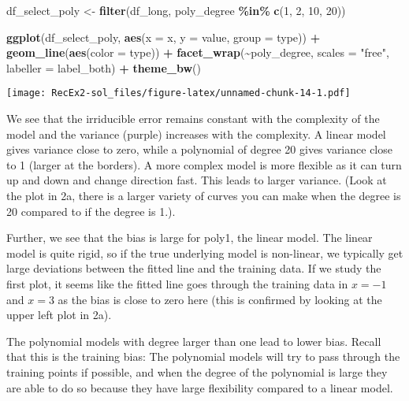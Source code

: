 \documentclass[
]{article}
\newenvironment{Shaded}{\begin{snugshade}}{\end{snugshade}}
\newcommand{\AttributeTok}[1]{\textcolor[rgb]{0.13,0.29,0.53}{#1}}
\newcommand{\DecValTok}[1]{\textcolor[rgb]{0.00,0.00,0.81}{#1}}
\newcommand{\FunctionTok}[1]{\textcolor[rgb]{0.13,0.29,0.53}{\textbf{#1}}}
\newcommand{\NormalTok}[1]{#1}
\newcommand{\OtherTok}[1]{\textcolor[rgb]{0.56,0.35,0.01}{#1}}
\newcommand{\SpecialCharTok}[1]{\textcolor[rgb]{0.81,0.36,0.00}{\textbf{#1}}}
\newcommand{\StringTok}[1]{\textcolor[rgb]{0.31,0.60,0.02}{#1}}
\begin{document}
\begin{Shaded}
\begin{Highlighting}[]
\NormalTok{df\_select\_poly }\OtherTok{\textless{}{-}} \FunctionTok{filter}\NormalTok{(df\_long, poly\_degree }\SpecialCharTok{\%in\%} \FunctionTok{c}\NormalTok{(}\DecValTok{1}\NormalTok{, }\DecValTok{2}\NormalTok{, }\DecValTok{10}\NormalTok{, }\DecValTok{20}\NormalTok{))}

\FunctionTok{ggplot}\NormalTok{(df\_select\_poly, }\FunctionTok{aes}\NormalTok{(}\AttributeTok{x =}\NormalTok{ x, }\AttributeTok{y =}\NormalTok{ value, }\AttributeTok{group =}\NormalTok{ type)) }\SpecialCharTok{+}
  \FunctionTok{geom\_line}\NormalTok{(}\FunctionTok{aes}\NormalTok{(}\AttributeTok{color =}\NormalTok{ type)) }\SpecialCharTok{+}
  \FunctionTok{facet\_wrap}\NormalTok{(}\SpecialCharTok{\textasciitilde{}}\NormalTok{poly\_degree, }\AttributeTok{scales =} \StringTok{"free"}\NormalTok{, }\AttributeTok{labeller =}\NormalTok{ label\_both) }\SpecialCharTok{+}
  \FunctionTok{theme\_bw}\NormalTok{()}
\end{Highlighting}
\end{Shaded}

\texttt{[image: RecEx2-sol\_files/figure-latex/unnamed-chunk-14-1.pdf]}

We see that the irriducible error remains constant with the complexity
of the model and the variance (purple) increases with the complexity. A
linear model gives variance close to zero, while a polynomial of degree
20 gives variance close to 1 (larger at the borders). A more complex
model is more flexible as it can turn up and down and change direction
fast. This leads to larger variance. (Look at the plot in 2a, there is a
larger variety of curves you can make when the degree is 20 compared to
if the degree is 1.).

Further, we see that the bias is large for poly1, the linear model. The
linear model is quite rigid, so if the true underlying model is
non-linear, we typically get large deviations between the fitted line
and the training data. If we study the first plot, it seems like the
fitted line goes through the training data in \(x=-1\) and \(x=3\) as
the bias is close to zero here (this is confirmed by looking at the
upper left plot in 2a).

The polynomial models with degree larger than one lead to lower bias.
Recall that this is the training bias: The polynomial models will try to
pass through the training points if possible, and when the degree of the
polynomial is large they are able to do so because they have large
flexibility compared to a linear model.
\end{document}
